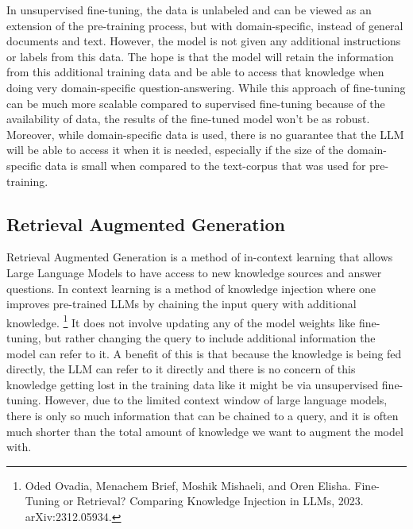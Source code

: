 \documentclass{article}
\begin{document}
    \noindent In unsupervised fine-tuning, the data is unlabeled and can be viewed as an extension of the pre-training process, but with domain-specific, instead of general documents and text. However, the model is not given any additional instructions or labels from this data. The hope is that the model will retain the information from this additional training data and be able to access that knowledge when doing very domain-specific question-answering. While this approach of fine-tuning can be much more scalable compared to supervised fine-tuning because of the availability of data, the results of the fine-tuned model won't be as robust. Moreover, while domain-specific data is used, there is no guarantee that the LLM will be able to access it when it is needed, especially if the size of the domain-specific data is small when compared to the text-corpus that was used for pre-training. 
    


\subsection{Retrieval Augmented Generation}   
    Retrieval Augmented Generation is a method of in-context learning that allows Large Language Models to have access to new knowledge sources and answer questions. In context learning is a method of knowledge injection where one improves pre-trained LLMs by chaining the input query with additional knowledge. \footnote{Oded Ovadia, Menachem Brief, Moshik Mishaeli, and Oren Elisha.
    Fine-Tuning or Retrieval? Comparing Knowledge Injection in LLMs, 2023. arXiv:2312.05934.} It does not involve updating any of the model weights like fine-tuning, but rather changing the query to include additional information the model can refer to it. A benefit of this is that because the knowledge is being fed directly, the LLM can refer to it directly and there is no concern of this knowledge getting lost in the training data like it might be via unsupervised fine-tuning. However, due to the limited context window of large language models, there is only so much information that can be chained to a query, and it is often much shorter than the total amount of knowledge we want to augment the model with. 
    \\
    
\end{document}
